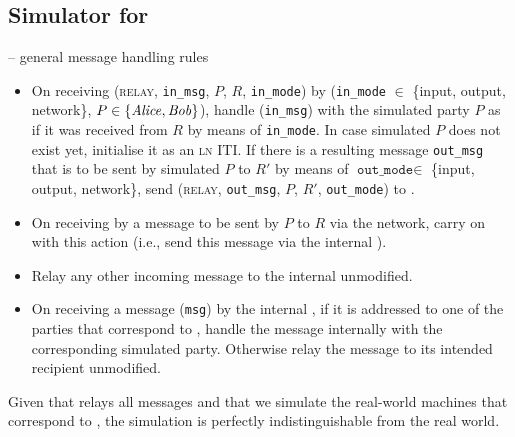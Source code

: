 \subsection{Simulator \simulator for \fchan}
\begin{center}
  \begin{simulatorbox}{\simulator{} -- general message handling rules}
    \begin{itemize}
      \item On receiving (\textsc{relay}, \texttt{in\_msg}, $P$, $R$,
      \texttt{in\_mode}) by \fchan (\texttt{in\_mode} $\in$ \{input, output,
      network\}, $P \in \{\mathit{Alice}, \mathit{Bob}\}$), handle (\texttt{in\_msg}) with the
      simulated party $P$ as if it was received from $R$ by means of
      \texttt{in\_mode}. In case simulated $P$ does not exist yet, initialise it
      as an \textsc{ln} ITI. If there is a resulting message \texttt{out\_msg}
      that is to be sent by simulated $P$ to $R'$ by means of
      $\texttt{out\_mode} \in$ \{input, output, network\}, send (\textsc{relay},
      \texttt{out\_msg}, $P$, $R'$, \texttt{out\_mode}) to \fchan.
      \item On receiving by \fchan a message to be sent by $P$ to $R$ via the
      network, carry on with this action (i.e., send this message via the
      internal \adversary).
      \item Relay any other incoming message to the internal \adversary
      unmodified.
      \item On receiving a message (\texttt{msg}) by the internal \adversary, if it is
      addressed to one of the parties that correspond to \fchan, handle the
      message internally with the corresponding simulated party. Otherwise relay
      the message to its intended recipient unmodified. 
    \end{itemize}

    Given that \fchan relays all messages and that we simulate the real-world
    machines that correspond to \fchan, the simulation is perfectly
    indistinguishable from the real world.
  \end{simulatorbox}
  \label{code:simulator:flow}
\end{center} \ \\

